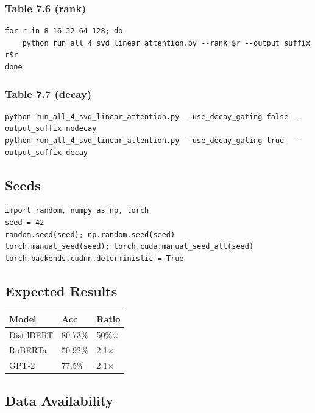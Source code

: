 \subsubsection{Table 7.6 (rank)}
\begin{lstlisting}
for r in 8 16 32 64 128; do
    python run_all_4_svd_linear_attention.py --rank $r --output_suffix r$r
done
\end{lstlisting}

\subsubsection{Table 7.7 (decay)}
\begin{lstlisting}
python run_all_4_svd_linear_attention.py --use_decay_gating false --output_suffix nodecay
python run_all_4_svd_linear_attention.py --use_decay_gating true  --output_suffix decay
\end{lstlisting}

\subsection{Seeds}

\begin{lstlisting}
import random, numpy as np, torch
seed = 42
random.seed(seed); np.random.seed(seed)
torch.manual_seed(seed); torch.cuda.manual_seed_all(seed)
torch.backends.cudnn.deterministic = True
\end{lstlisting}

\subsection{Expected Results}

\begin{table}[H]
\centering
\small
\begin{tabular}{lll}
\toprule
\textbf{Model} & \textbf{Acc} & \textbf{Ratio} \\
\midrule
DistilBERT & 80.73\% & 50\%$\times$ \\
RoBERTa & 50.92\% & 2.1$\times$ \\
GPT-2 & 77.5\% & 2.1$\times$ \\
\bottomrule
\end{tabular}
\end{table}

\subsection{Data Availability}

